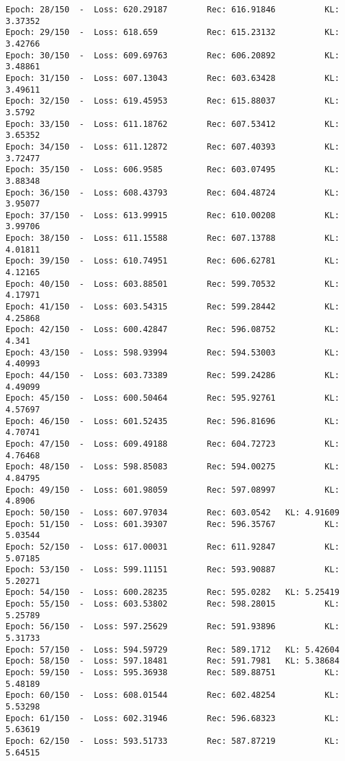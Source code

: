 \documentclass[11pt]{article}
\begin{document}
\begin{Verbatim}[commandchars=\\\{\}]
Epoch: 28/150  -  Loss: 620.29187        Rec: 616.91846          KL: 3.37352
Epoch: 29/150  -  Loss: 618.659          Rec: 615.23132          KL: 3.42766
Epoch: 30/150  -  Loss: 609.69763        Rec: 606.20892          KL: 3.48861
Epoch: 31/150  -  Loss: 607.13043        Rec: 603.63428          KL: 3.49611
Epoch: 32/150  -  Loss: 619.45953        Rec: 615.88037          KL: 3.5792
Epoch: 33/150  -  Loss: 611.18762        Rec: 607.53412          KL: 3.65352
Epoch: 34/150  -  Loss: 611.12872        Rec: 607.40393          KL: 3.72477
Epoch: 35/150  -  Loss: 606.9585         Rec: 603.07495          KL: 3.88348
Epoch: 36/150  -  Loss: 608.43793        Rec: 604.48724          KL: 3.95077
Epoch: 37/150  -  Loss: 613.99915        Rec: 610.00208          KL: 3.99706
Epoch: 38/150  -  Loss: 611.15588        Rec: 607.13788          KL: 4.01811
Epoch: 39/150  -  Loss: 610.74951        Rec: 606.62781          KL: 4.12165
Epoch: 40/150  -  Loss: 603.88501        Rec: 599.70532          KL: 4.17971
Epoch: 41/150  -  Loss: 603.54315        Rec: 599.28442          KL: 4.25868
Epoch: 42/150  -  Loss: 600.42847        Rec: 596.08752          KL: 4.341
Epoch: 43/150  -  Loss: 598.93994        Rec: 594.53003          KL: 4.40993
Epoch: 44/150  -  Loss: 603.73389        Rec: 599.24286          KL: 4.49099
Epoch: 45/150  -  Loss: 600.50464        Rec: 595.92761          KL: 4.57697
Epoch: 46/150  -  Loss: 601.52435        Rec: 596.81696          KL: 4.70741
Epoch: 47/150  -  Loss: 609.49188        Rec: 604.72723          KL: 4.76468
Epoch: 48/150  -  Loss: 598.85083        Rec: 594.00275          KL: 4.84795
Epoch: 49/150  -  Loss: 601.98059        Rec: 597.08997          KL: 4.8906
Epoch: 50/150  -  Loss: 607.97034        Rec: 603.0542   KL: 4.91609
Epoch: 51/150  -  Loss: 601.39307        Rec: 596.35767          KL: 5.03544
Epoch: 52/150  -  Loss: 617.00031        Rec: 611.92847          KL: 5.07185
Epoch: 53/150  -  Loss: 599.11151        Rec: 593.90887          KL: 5.20271
Epoch: 54/150  -  Loss: 600.28235        Rec: 595.0282   KL: 5.25419
Epoch: 55/150  -  Loss: 603.53802        Rec: 598.28015          KL: 5.25789
Epoch: 56/150  -  Loss: 597.25629        Rec: 591.93896          KL: 5.31733
Epoch: 57/150  -  Loss: 594.59729        Rec: 589.1712   KL: 5.42604
Epoch: 58/150  -  Loss: 597.18481        Rec: 591.7981   KL: 5.38684
Epoch: 59/150  -  Loss: 595.36938        Rec: 589.88751          KL: 5.48189
Epoch: 60/150  -  Loss: 608.01544        Rec: 602.48254          KL: 5.53298
Epoch: 61/150  -  Loss: 602.31946        Rec: 596.68323          KL: 5.63619
Epoch: 62/150  -  Loss: 593.51733        Rec: 587.87219          KL: 5.64515

\end{Verbatim}
\end{document}
